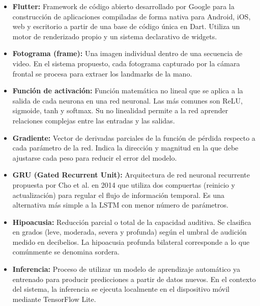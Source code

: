 \begin{itemize}
    \item[] \textbf{Flutter:} Framework de código abierto desarrollado por Google para la construcción de aplicaciones compiladas de forma nativa para Android, iOS, web y escritorio a partir de una base de código única en Dart. Utiliza un motor de renderizado propio y un sistema declarativo de widgets.\\

    \item[] \textbf{Fotograma (frame):} Una imagen individual dentro de una secuencia de video. En el sistema propuesto, cada fotograma capturado por la cámara frontal se procesa para extraer los landmarks de la mano.\\

    \item[] \textbf{Función de activación:} Función matemática no lineal que se aplica a la salida de cada neurona en una red neuronal. Las más comunes son ReLU, sigmoide, tanh y softmax. Su no linealidad permite a la red aprender relaciones complejas entre las entradas y las salidas.\\

    \item[] \textbf{Gradiente:} Vector de derivadas parciales de la función de pérdida respecto a cada parámetro de la red. Indica la dirección y magnitud en la que debe ajustarse cada peso para reducir el error del modelo.\\

    \item[] \textbf{GRU (Gated Recurrent Unit):} Arquitectura de red neuronal recurrente propuesta por Cho et al. en 2014 que utiliza dos compuertas (reinicio y actualización) para regular el flujo de información temporal. Es una alternativa más simple a la LSTM con menor número de parámetros.\\

    \item[] \textbf{Hipoacusia:} Reducción parcial o total de la capacidad auditiva. Se clasifica en grados (leve, moderada, severa y profunda) según el umbral de audición medido en decibelios. La hipoacusia profunda bilateral corresponde a lo que comúnmente se denomina sordera.\\

    \item[] \textbf{Inferencia:} Proceso de utilizar un modelo de aprendizaje automático ya entrenado para producir predicciones a partir de datos nuevos. En el contexto del sistema, la inferencia se ejecuta localmente en el dispositivo móvil mediante TensorFlow Lite.\\


\end{itemize}
